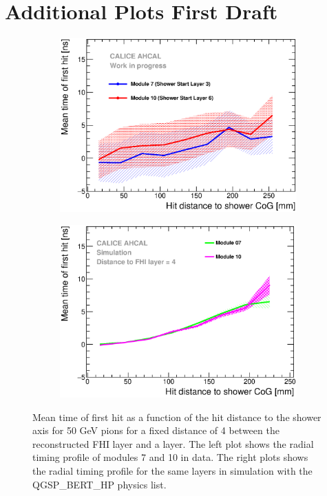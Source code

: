 \documentclass[12pt]{article}
\begin{document}
\section{Additional Plots First Draft}

\begin{figure}[htbp!]
  \begin{subfigure}[t]{0.49\textwidth}
    \centering
    \includegraphics[width=1\textwidth]{../../Draft/fig/Timing_Radius_Comparison_ShortAsymRange_ShowerStart.eps}
    \caption{}\label{fig:Radius_FHI}
  \end{subfigure}
  \hfill
  \begin{subfigure}[t]{0.49\textwidth}
    \centering
    \includegraphics[width=1\textwidth]{../../Draft/fig/Radius_ShowerStartTruth.eps}
    \caption{}\label{fig:Radius_FHISim1}
  \end{subfigure}
  \caption{Mean time of first hit as a function of the hit distance to the shower axis for 50 GeV pions for a fixed distance of 4 between the reconstructed FHI layer and a layer. The left plot shows the radial timing profile of modules 7 and 10 in data. The right plots shows the radial timing profile for the same layers in simulation with the QGSP\_BERT\_HP physics list.}
  \label{fig:Radius_FHIAll}
\end{figure}
\end{document}
